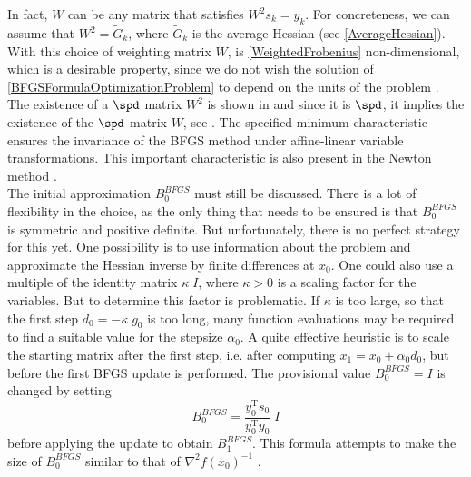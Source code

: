 In fact, $W$ can be any matrix that satisfies $W^2 s_k = y_k$. For concreteness, we can assume that $W^2 = \tilde{G}_k$, where $\tilde{G}_k$ is the average Hessian (see \cref{AverageHessian}). With this choice of weighting matrix $W$, is \cref{WeightedFrobenius} non-dimensional, which is a desirable property, since we do not wish the solution of \cref{BFGSFormulaOptimizationProblem} to depend on the units of the problem \cite[p.~139-140]{NocedalWright:2006}. The existence of a $\spd$ matrix $W^2$ is shown in \cite[Lemma~11.5.]{GeigerKanzow:1999} and since it is $\spd$, it implies the existence of the $\spd$ matrix $W$, see \cite[Satz~B.6.]{GeigerKanzow:1999}. The specified minimum characteristic ensures the invariance of the BFGS method under affine-linear variable transformations. This important characteristic is also present in the Newton method \cite[p.~69]{UlbrichUlbrich:2012}. \\
The initial approximation $B^{BFGS}_0$ must still be discussed. There is a lot of flexibility in the choice, as the only thing that needs to be ensured is that $B^{BFGS}_0$ is symmetric and positive definite. But unfortunately, there is no perfect strategy for this yet. One possibility is to use information about the problem and approximate the Hessian inverse by finite differences at $x_0$. One could also use a multiple of the identity matrix $\kappa \; I$, where $\kappa > 0$ is a scaling factor for the variables. But to determine this factor is problematic. If $\kappa$ is too large, so that the first step $d_0 = -\kappa \; g_0$ is too long, many function evaluations may be required to find a suitable value for the stepsize $\alpha_0$. A quite effective heuristic is to scale the starting matrix after the first step, i.e. after computing $x_{1} = x_0 + \alpha_0 d_0$, but before the first BFGS update is performed. The provisional value $B^{BFGS}_0 = I$ is changed by setting
\begin{equation*}
    B^{BFGS}_0 = \frac{y^{\mathrm{T}}_0 s_0}{y^{\mathrm{T}}_0 y_0} \; I
\end{equation*}
before applying the update to obtain $B^{BFGS}_1$. This formula attempts to make the size of $B^{BFGS}_0$ similar to that of $\nabla^2 f (x_0)^{-1}$ \cite[p.~142-143]{NocedalWright:2006}.
